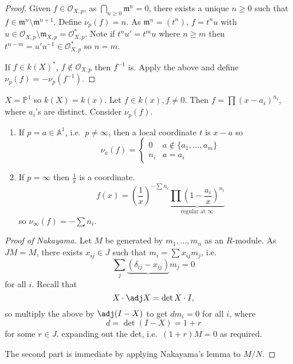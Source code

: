 \documentclass[a4paper]{article}
\renewcommand{\A}{\mathbb{A}}
\renewcommand*{\P}{\mathbb{P}}
\begin{document}
\begin{proof}
  Given \(f \in \mathcal O_{X, p}\), as \(\bigcap_{n \geq 0} \mathfrak m^n = 0\), there exists a unique \(n \geq 0\) such that \(f \in \mathfrak m^n \setminus \mathfrak m^{n + 1}\). Define \(\nu_p(f) = n\). As \(\mathfrak m^n = (t^n)\), \(f = t^n u\) with \(u \in \mathcal O_{X, p} \setminus \mathfrak m_{X, p} = \mathcal O_{X, p}^*\). Note if \(t^n u' = t^m u\) where \(n \geq m\) then \(t^{n - m} = u' u^{-1} \in \mathcal O_{X, p}^*\) so \(n = m\).

  If \(f \in k(X)^*\), \(f \notin \mathcal O_{X, p}\) then \(f^{-1}\) is. Apply the above and define \(\nu_p(f) = - \nu_p(f^{-1})\).
\end{proof}

\begin{eg}
  \(X = \P^1\) so \(k(X) = k(x)\). Let \(f \in k(x), f \neq 0\). Then \(f = \prod (x - a_i)^{n_i}\), where \(a_i\)'s are distinct. Consider \(\nu_p(f)\).
  \begin{enumerate}
  \item If \(p = a \in \A^1\), i.e.\ \(p \neq \infty\), then a local coordinate \(t\) is \(x - a\) so
    \[
      \nu_a(f) =
      \begin{cases}
        0 & a \notin \{a_1, \dots, a_m\} \\
        n_i & a = a_i
      \end{cases}
    \]
  \item If \(p = \infty\) then \(\frac{1}{x}\) is a coordinate.
    \[
      f(x) = (\frac{1}{x})^{- \sum n_i} \underbrace{\prod (1 - \frac{a_i}{x})^{n_i}}_{\text{regular at } \infty}
    \]
    so \(\nu_\infty(f) = - \sum n_i\).
  \end{enumerate}
\end{eg}

\begin{proof}[Proof of Nakayama]
  Let \(M\) be generated by \(m_1, \dots, m_n\) as an \(R\)-module. As \(JM = M\), there exists \(x_{ij} \in J\) such that \(m_i = \sum x_{ij} m_j\), i.e.
  \[
    \sum_j \underbrace{(\delta_{ij} - x_{ij})} m_j = 0
  \]
  for all \(i\). Recall that
  \[
    X \cdot \adj X = \det X \cdot I,
  \]
  so multiply the above by \(\adj (I - X)\) to get \(d m_i = 0\) for all \(i\), where
  \[
    d = \det (I - X) = 1 + r
  \]
  for some \(r \in J\). expanding out the det, i.e.\ \((1 + r)M = 0\) as required.

  The second part is immediate by applying Nakayama's lemma to \(M/N\).
\end{proof}
\end{document}

